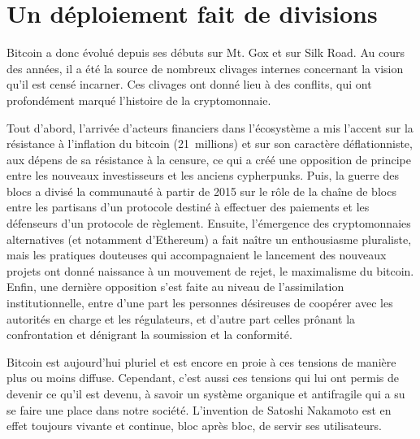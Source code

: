 \section*{Un déploiement fait de divisions}

Bitcoin a donc évolué depuis ses débuts sur Mt. Gox et sur Silk Road. Au cours des années, il a été la source de nombreux clivages internes concernant la vision qu'il est censé incarner. Ces clivages ont donné lieu à des conflits, qui ont profondément marqué l'histoire de la cryptomonnaie.

Tout d'abord, l'arrivée d'acteurs financiers dans l'écosystème a mis l'accent sur la résistance à l'inflation du bitcoin (21~millions) et sur son caractère déflationniste, aux dépens de sa résistance à la censure, ce qui a créé une opposition de principe entre les nouveaux investisseurs et les anciens cypherpunks. Puis, la guerre des blocs a divisé la communauté à partir de 2015 sur le rôle de la chaîne de blocs entre les partisans d'un protocole destiné à effectuer des paiements et les défenseurs d'un protocole de règlement. Ensuite, l'émergence des cryptomonnaies alternatives (et notamment d'Ethereum) a fait naître un enthousiasme pluraliste, mais les pratiques douteuses qui accompagnaient le lancement des nouveaux projets ont donné naissance à un mouvement de rejet, le maximalisme du bitcoin. Enfin, une dernière opposition s'est faite au niveau de l'assimilation institutionnelle, entre d'une part les personnes désireuses de coopérer avec les autorités en charge et les régulateurs, et d'autre part celles prônant la confrontation et dénigrant la soumission et la conformité.

Bitcoin est aujourd'hui pluriel et est encore en proie à ces tensions de manière plus ou moins diffuse. Cependant, c'est aussi ces tensions qui lui ont permis de devenir ce qu'il est devenu, à savoir un système organique et antifragile qui a su se faire une place dans notre société. L'invention de Satoshi Nakamoto est en effet toujours vivante et continue, bloc après bloc, de servir ses utilisateurs.

\printendnotes